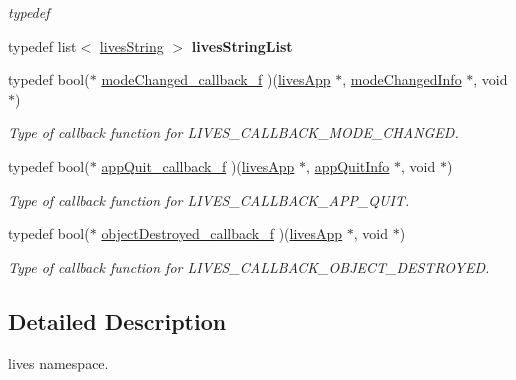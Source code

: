 \begin{DoxyCompactItemize}
\begin{DoxyCompactList}\small\item\em typedef \end{DoxyCompactList}\item 
\hypertarget{namespacelives_af8765db2769fbeb69399fd6980e9990f}{typedef list$<$ \hyperlink{classlives_1_1livesString}{lives\-String} $>$ {\bfseries lives\-String\-List}}\label{namespacelives_af8765db2769fbeb69399fd6980e9990f}

\item 
typedef bool($\ast$ \hyperlink{namespacelives_a3f53f9a55851d8980f02ddc790b12720}{mode\-Changed\-\_\-callback\-\_\-f} )(\hyperlink{classlives_1_1livesApp}{lives\-App} $\ast$, \hyperlink{structlives_1_1modeChangedInfo}{mode\-Changed\-Info} $\ast$, void $\ast$)
\begin{DoxyCompactList}\small\item\em Type of callback function for L\-I\-V\-E\-S\-\_\-\-C\-A\-L\-L\-B\-A\-C\-K\-\_\-\-M\-O\-D\-E\-\_\-\-C\-H\-A\-N\-G\-E\-D. \end{DoxyCompactList}\item 
typedef bool($\ast$ \hyperlink{namespacelives_a097f122e1e32156c1acc94f8987d3384}{app\-Quit\-\_\-callback\-\_\-f} )(\hyperlink{classlives_1_1livesApp}{lives\-App} $\ast$, \hyperlink{structlives_1_1appQuitInfo}{app\-Quit\-Info} $\ast$, void $\ast$)
\begin{DoxyCompactList}\small\item\em Type of callback function for L\-I\-V\-E\-S\-\_\-\-C\-A\-L\-L\-B\-A\-C\-K\-\_\-\-A\-P\-P\-\_\-\-Q\-U\-I\-T. \end{DoxyCompactList}\item 
typedef bool($\ast$ \hyperlink{namespacelives_af2316179e783c96b4c146713929726f7}{object\-Destroyed\-\_\-callback\-\_\-f} )(\hyperlink{classlives_1_1livesApp}{lives\-App} $\ast$, void $\ast$)
\begin{DoxyCompactList}\small\item\em Type of callback function for L\-I\-V\-E\-S\-\_\-\-C\-A\-L\-L\-B\-A\-C\-K\-\_\-\-O\-B\-J\-E\-C\-T\-\_\-\-D\-E\-S\-T\-R\-O\-Y\-E\-D. \end{DoxyCompactList}\end{DoxyCompactItemize}


\subsection{Detailed Description}
lives namespace. 

